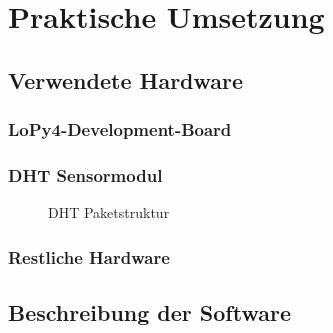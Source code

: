 
\chapter{Praktische Umsetzung} \label{Praktische Umsetzung}
\section{Verwendete Hardware} \label{Hardware}
\subsection{LoPy4-Development-Board} \label{LoPy4}



\subsection{DHT Sensormodul} \label{DHT}

\begin{center}
	\begin{figure}[h]
	 
	 \noindent{}
	 \caption[DHT Paketstruktur]{DHT Paketstruktur}
	 \label{fig:zeitplanung}
	\end{figure}
\end{center}



\subsection{Restliche Hardware} \label{Restliche Hardware}




\section{Beschreibung der Software} \label{Software}

